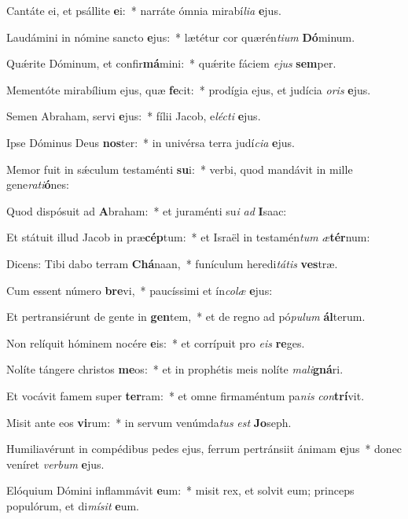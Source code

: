 \item Cantáte ei, et psállite \textbf{e}i:~* narráte ómnia mirabí\textit{li}\textit{a} \textbf{e}jus.
\item Laudámini in nómine sancto \textbf{e}jus:~* lætétur cor quærén\textit{ti}\textit{um} \textbf{Dó}minum.
\item Quǽrite Dóminum, et confir\textbf{má}mini:~* quǽrite fáciem \textit{e}\textit{jus} \textbf{sem}per.
\item Mementóte mirabílium ejus, quæ \textbf{fe}cit:~* prodígia ejus, et judícia \textit{o}\textit{ris} \textbf{e}jus.
\item Semen Abraham, servi \textbf{e}jus:~* fílii Jacob, e\textit{léc}\textit{ti} \textbf{e}jus.
\item Ipse Dóminus Deus \textbf{nos}ter:~* in univérsa terra judí\textit{ci}\textit{a} \textbf{e}jus.
\item Memor fuit in sǽculum testaménti \textbf{su}i:~* verbi, quod mandávit in mille gene\textit{ra}\textit{ti}\textbf{ó}nes:
\item Quod dispósuit ad \textbf{A}braham:~* et juraménti su\textit{i} \textit{ad} \textbf{I}saac:
\item Et státuit illud Jacob in præ\textbf{cép}tum:~* et Israël in testamén\textit{tum} \textit{æ}\textbf{tér}num:
\item Dicens: Tibi dabo terram \textbf{Chá}naan,~* funículum heredi\textit{tá}\textit{tis} \textbf{ves}træ.
\item Cum essent número \textbf{bre}vi,~* paucíssimi et ín\textit{co}\textit{læ} \textbf{e}jus:
\item Et pertransiérunt de gente in \textbf{gen}tem,~* et de regno ad pó\textit{pu}\textit{lum} \textbf{ál}terum.
\item Non relíquit hóminem nocére \textbf{e}is:~* et corrípuit pro \textit{e}\textit{is} \textbf{re}ges.
\item Nolíte tángere christos \textbf{me}os:~* et in prophétis meis nolíte \textit{ma}\textit{li}\textbf{gná}ri.
\item Et vocávit famem super \textbf{ter}ram:~* et omne firmaméntum pa\textit{nis} \textit{con}\textbf{trí}vit.
\item Misit ante eos \textbf{vi}rum:~* in servum venúmda\textit{tus} \textit{est} \textbf{Jo}seph.
\item Humiliavérunt in compédibus pedes ejus, ferrum pertránsiit ánimam \textbf{e}jus~* donec veníret \textit{ver}\textit{bum} \textbf{e}jus.
\item Elóquium Dómini inflammávit \textbf{e}um:~* misit rex, et solvit eum; princeps populórum, et di\textit{mí}\textit{sit} \textbf{e}um.
